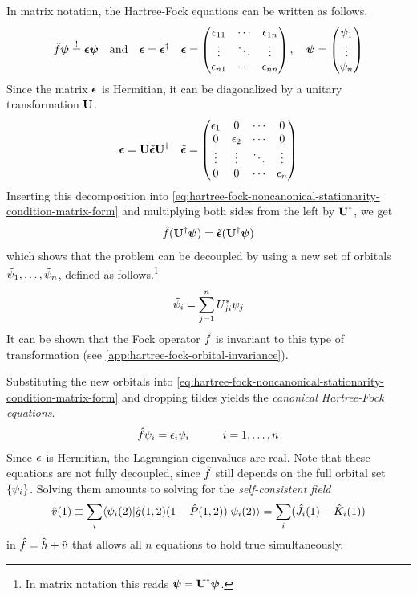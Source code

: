 \documentclass[11pt]{article}
\numberwithin{equation}{section}
\begin{document}
In matrix notation, the Hartree-Fock equations can be written as follows.
\begin{align}\label{eq:hartree-fock-noncanonical-stationarity-condition-matrix-form}
  \op{f}\bm\y
\overset{!}=
  \bm{\ev}\bm{\y}
\hspace{10pt}
  \text{and}
\hspace{10pt}
  \bm{\ev}=\bm{\ev}\dg
&&
  \bm{\ev}
=
  \ma{
    \ev_{11}&\cd&\ev_{1n}\\
    \vd&\dd&\vd\\
    \ev_{n1}&\cd&\ev_{nn}
  },
\hspace{10pt}
  \bm\y
=
  \ma{\y_1\\\vd\\\y_n}
\end{align}
Since the matrix $\bm{\ev}$ is Hermitian, it can be diagonalized by a unitary transformation $\mathbf{U}$.
\begin{align}
  \bm{\ev}
=
  \bo{U}\tl{\bm{\ev}}\bo{U}\dg
&&
  \tl{\bm{\ev}}
=
  \ma{
    \ev_1& 0 & \cd & 0\\
    0 & \ev_2 &\cd & 0\\
    \vd & \vd &\dd & \vd \\
    0 & 0 & \cd & \ev_n
  }
\end{align}
Inserting this decomposition into \cref{eq:hartree-fock-noncanonical-stationarity-condition-matrix-form} and multiplying both sides from the left by $\mathbf{U}^\dagger$, we get
\begin{align*}
  \op{f}(\bo{U}\dg\bm\y)
=
  \tl{\bm{\ev}}(\bo{U}\dg\bm\y)
\end{align*}
which shows that the problem can be decoupled by using a new set of orbitals  $\tilde{\psi }_1,\ldots,\tilde{\psi }_n$, defined as follows.\footnote{In matrix notation this reads $\tl{\bm\y}=\bo{U}\dg\bm\y$.}
\begin{align}
  \tilde{\psi }_i
=
  \sum_{j=1}^n U_{ji}^*\psi _j
\end{align}
It can be shown that the Fock operator $\hat{f}$ is invariant to this type of transformation (see \cref{app:hartree-fock-orbital-invariance}).

Substituting the new orbitals into \cref{eq:hartree-fock-noncanonical-stationarity-condition-matrix-form} and dropping tildes yields the \textit{canonical Hartree-Fock equations}.
\begin{align*}
  \hat{f}\psi _i
=
  \epsilon _i\psi _i
\hspace{30pt}
  i=1,\ldots,n
\end{align*}
Since $\bm{\ev}$ is Hermitian, the Lagrangian eigenvalues are real.
Note that these equations are not fully decoupled, since $\hat{f}$ still depends on the full orbital set $\{\psi _i\}$.
Solving them amounts to solving for the {\it self-consistent field}
\begin{align}
  \hat{v}(1)
\equiv
\sum_i
  \langle\psi _i(2)|\hat{g}(1,2)(1-\hat{P}(1,2))|\psi _i(2)\rangle
=
\sum_i
  (\hat{J}_i(1)-\hat{K}_i(1))
\end{align}
in $\hat{f}=\hat{h}+\hat{v}$ that allows all $n$ equations to hold true simultaneously.
\end{document}
